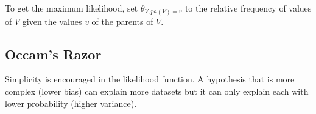 \documentclass[11pt]{article}
\begin{document}
To get the maximum likelihood, set \(\theta_{V, pa(V) = v}\) to the relative frequency of
values of \(V\) given the values \(v\) of the parents of \(V\).
\subsection{Occam's Razor}
\label{sec:org55149e7}
Simplicity is encouraged in the likelihood function.
A hypothesis that is more complex (lower bias) can explain more datasets but it
can only explain each with lower probability (higher variance).
\end{document}
